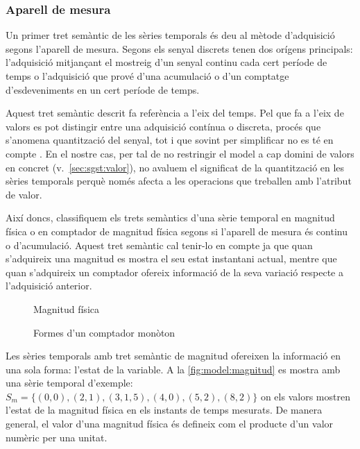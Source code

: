 \subsubsection{Aparell de mesura}


Un primer tret semàntic de les sèries temporals és deu al mètode
d'adquisició segons l'aparell de mesura.  Segons
\textcite[cap.~1]{proakismanolakis96} els senyal discrets tenen dos
orígens principals: l'adquisició mitjançant el mostreig d'un senyal
continu cada cert període de temps o l'adquisició que prové d'una
acumulació o d'un comptatge d'esdeveniments en un cert període de
temps. 


Aquest tret semàntic descrit fa referència a l'eix del
temps. Pel que fa a l'eix de valors es pot distingir entre una
adquisició contínua o discreta, procés que s'anomena quantització del
senyal, tot i que sovint per simplificar no es té en
compte \parencite{proakismanolakis96}.%
En el nostre cas, per tal de no restringir el model a cap domini de
valors en concret (v.~\autoref{sec:sgst:valor}), no avaluem el
significat de la quantització en les sèries temporals perquè només
afecta a les operacions que treballen amb l'atribut de valor.


Així doncs, classifiquem els trets semàntics d'una sèrie temporal en
magnitud física o en comptador de magnitud física segons si l'aparell
de mesura és continu o d'acumulació. Aquest tret semàntic cal
tenir-lo en compte ja que quan s'adquireix una magnitud es mostra el
seu estat instantani actual, mentre que quan s'adquireix un comptador
ofereix informació de la seva variació respecte a l'adquisició
anterior.



\begin{figure}[tp]
  \centering
  
  \caption{Magnitud física}
  \label{fig:model:magnitud}
\end{figure}

\begin{figure}[tp]
  \centering
  
  \caption{Formes d'un comptador monòton}
  \label{fig:model:comptador-formes}
\end{figure}



Les sèries temporals amb tret semàntic de magnitud ofereixen la
informació en una sola forma: l'estat de la variable. A la
\autoref{fig:model:magnitud} es mostra amb una sèrie temporal
d'exemple: $S_m = \{(0,0),(2,1),(3, 1{,}5),(4,0),(5,2),(8,2)\}$ on els
valors mostren l'estat de la magnitud física en els instants de temps
mesurats. De manera general, el valor d’una magnitud física és
defineix com el producte d’un valor numèric per una unitat.


